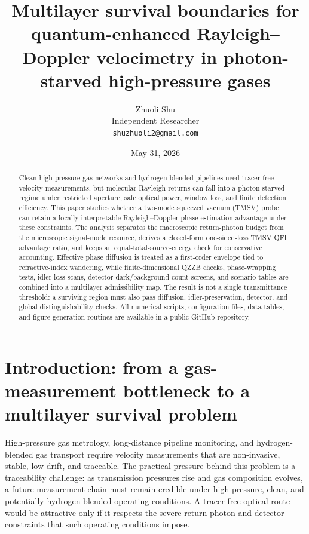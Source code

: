 \documentclass[a4paper,11pt]{article}
\title{Multilayer survival boundaries for quantum-enhanced Rayleigh--Doppler velocimetry in photon-starved high-pressure gases}
\author{Zhuoli Shu\\
Independent Researcher\\
\texttt{shuzhuoli2@gmail.com}}
\date{May 31, 2026}
\numberwithin{equation}{section}
\begin{document}
\maketitle

\begin{abstract}
Clean high-pressure gas networks and hydrogen-blended pipelines need tracer-free velocity measurements, but molecular Rayleigh returns can fall into a photon-starved regime under restricted aperture, safe optical power, window loss, and finite detection efficiency. This paper studies whether a two-mode squeezed vacuum (TMSV) probe can retain a locally interpretable Rayleigh--Doppler phase-estimation advantage under these constraints. The analysis separates the macroscopic return-photon budget from the microscopic signal-mode resource, derives a closed-form one-sided-loss TMSV QFI advantage ratio, and keeps an equal-total-source-energy check for conservative accounting. Effective phase diffusion is treated as a first-order envelope tied to refractive-index wandering, while finite-dimensional QZZB checks, phase-wrapping tests, idler-loss scans, detector dark/background-count screens, and scenario tables are combined into a multilayer admissibility map. The result is not a single transmittance threshold: a surviving region must also pass diffusion, idler-preservation, detector, and global distinguishability checks. All numerical scripts, configuration files, data tables, and figure-generation routines are available in a public GitHub repository.
\end{abstract}

\section{Introduction: from a gas-measurement bottleneck to a multilayer survival problem}

High-pressure gas metrology, long-distance pipeline monitoring, and hydrogen-blended gas transport require velocity measurements that are non-invasive, stable, low-drift, and traceable. The practical pressure behind this problem is a traceability challenge: as transmission pressures rise and gas composition evolves, a future measurement chain must remain credible under high-pressure, clean, and potentially hydrogen-blended operating conditions. A tracer-free optical route would be attractive only if it respects the severe return-photon and detector constraints that such operating conditions impose.
\end{document}
